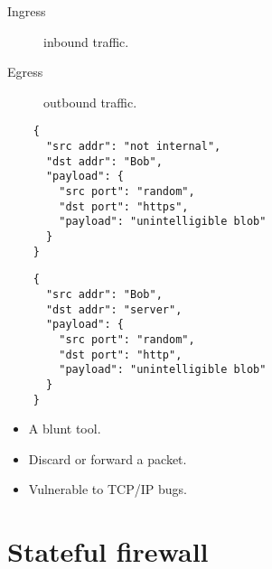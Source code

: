 \begin{frame}
  \begin{definition}
    \begin{description}
      \item[Ingress] inbound traffic.
      \item[Egress] outbound traffic.
    \end{description}
  \end{definition}
\end{frame}

\begin{frame}[fragile]
  \begin{example}
  \begin{verbatim}
    {
      "src addr": "not internal",
      "dst addr": "Bob",
      "payload": {
        "src port": "random",
        "dst port": "https",
        "payload": "unintelligible blob"
      }
    }
  \end{verbatim}
  \end{example}
\end{frame}

\begin{frame}[fragile]
  \begin{example}
  \begin{verbatim}
    {
      "src addr": "Bob",
      "dst addr": "server",
      "payload": {
        "src port": "random",
        "dst port": "http",
        "payload": "unintelligible blob"
      }
    }
  \end{verbatim}
  \end{example}
\end{frame}

\begin{frame}
  \begin{remark}
    \begin{itemize}
      \item A blunt tool.
      \item Discard or forward a packet.
      \item Vulnerable to TCP/IP bugs.
    \end{itemize}
  \end{remark}
\end{frame}


\section{Stateful firewall}

